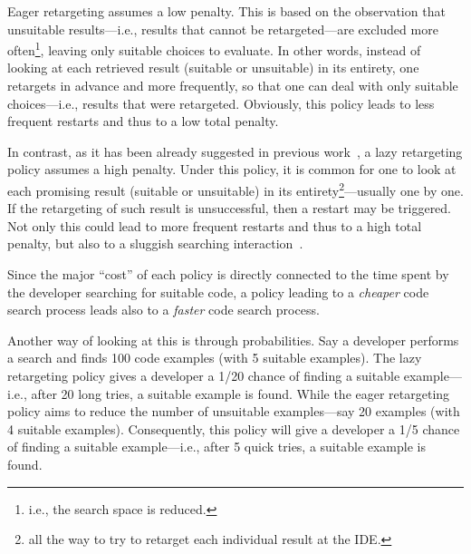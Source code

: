 Eager retargeting assumes a low penalty. This is based on the observation that unsuitable results---i.e., results that cannot be retargeted---are excluded more often\footnote{i.e., the search space is reduced.}, leaving only suitable choices to evaluate. In other words, instead of looking at each retrieved result (suitable or unsuitable) in its entirety, one retargets in advance and more frequently, so that one can deal with only suitable choices---i.e., results that were retargeted. Obviously, this policy leads to less frequent restarts and thus to a low total penalty.

In contrast, as it has been already suggested in previous work~\cite{Brandt:2009ew, Wightman:2012gc}, a lazy retargeting policy assumes a high penalty. Under this policy, it is common for one to look at each promising result (suitable or unsuitable) in its entirety\footnote{all the way to try to retarget each individual result at the IDE.}---usually one by one. If the retargeting of such result is unsuccessful, then a restart may be triggered. Not only this could lead to more frequent restarts and thus to a high total penalty, but also to a sluggish searching interaction~\cite{Gray:2000im}.

Since the major ``cost'' of each policy is directly connected to the time spent by the developer searching for suitable code, a policy leading to a \emph{cheaper} code search process leads also to a \emph{faster} code search process.

Another way of looking at this is through probabilities. Say a developer performs a search and finds 100 code examples (with 5 suitable examples). The lazy retargeting policy gives a developer a 1/20 chance of finding a suitable example---i.e., after 20 long tries, a suitable example is found. While the eager retargeting policy aims to reduce the number of unsuitable examples---say 20 examples (with 4 suitable examples). Consequently, this policy will give a developer a 1/5 chance of finding a suitable example---i.e., after 5 quick tries, a suitable example is found.

% 
% 
% 


